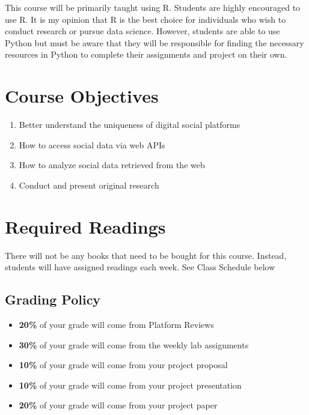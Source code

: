 \documentclass[11pt,]{article}
\begin{document}
This course will be primarily taught using R. Students are highly
encouraged to use R. It is my opinion that R is the best choice for
individuals who wish to conduct research or pursue data science.
However, students are able to use Python but must be aware that they
will be responsible for finding the necessary resources in Python to
complete their assignments and project on their own.

\hypertarget{course-objectives}{%
\section{Course Objectives}\label{course-objectives}}

\begin{enumerate}
\def\labelenumi{\arabic{enumi}.}
\item
  Better understand the uniqueness of digital social platforms
\item
  How to access social data via web APIs
\item
  How to analyze social data retrieved from the web
\item
  Conduct and present original research
\end{enumerate}

\hypertarget{required-readings}{%
\section{Required Readings}\label{required-readings}}

There will not be any books that need to be bought for this course.
Instead, students will have assigned readings each week. See Class
Schedule below

\hypertarget{grading-policy}{%
\subsection{Grading Policy}\label{grading-policy}}

\begin{itemize}
\item
  \textbf{20\%} of your grade will come from Platform Reviews
\item
  \textbf{30\%} of your grade will come from the weekly lab assignments
\item
  \textbf{10\%} of your grade will come from your project proposal
\item
  \textbf{10\%} of your grade will come from your project presentation
\item
  \textbf{20\%} of your grade will come from your project paper
\end{itemize}
\end{document}
